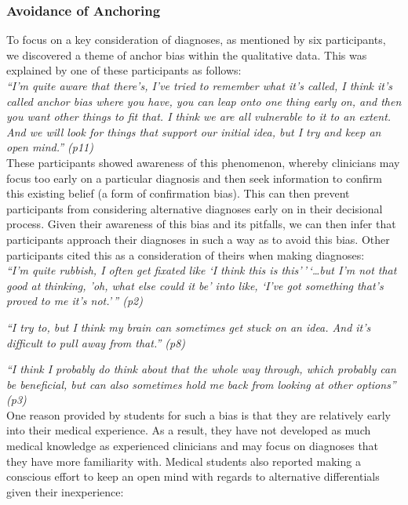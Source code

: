 \documentclass[a4paper, nobind]{templates/ociamthesis}
\begin{document}
\subsubsection*{Avoidance of Anchoring}\label{avoidance-of-anchoring}

To focus on a key consideration of diagnoses, as mentioned by six participants, we discovered a theme of anchor bias within the qualitative data. This was explained by one of these participants as follows:\\

\emph{``I'm quite aware that there's, I've tried to remember what it's called, I think it's called anchor bias where you have, you can leap onto one thing early on, and then you want other things to fit that. I think we are all vulnerable to it to an extent. And we will look for things that support our initial idea, but I try and keep an open mind.'' (p11)}\\

These participants showed awareness of this phenomenon, whereby clinicians may focus too early on a particular diagnosis and then seek information to confirm this existing belief (a form of confirmation bias). This can then prevent participants from considering alternative diagnoses early on in their decisional process. Given their awareness of this bias and its pitfalls, we can then infer that participants approach their diagnoses in such a way as to avoid this bias. Other participants cited this as a consideration of theirs when making diagnoses:\\

\emph{``I'm quite rubbish, I often get fixated like `I think this is this'\,'\,`\ldots but I'm not that good at thinking, 'oh, what else could it be' into like, `I've got something that's proved to me it's not.'\,'' (p2)}

\emph{``I try to, but I think my brain can sometimes get stuck on an idea. And it's difficult to pull away from that.'' (p8)}

\emph{``I think I probably do think about that the whole way through, which probably can be beneficial, but can also sometimes hold me back from looking at other options'' (p3)}\\

One reason provided by students for such a bias is that they are relatively early into their medical experience. As a result, they have not developed as much medical knowledge as experienced clinicians and may focus on diagnoses that they have more familiarity with. Medical students also reported making a conscious effort to keep an open mind with regards to alternative differentials given their inexperience:\\
\end{document}
